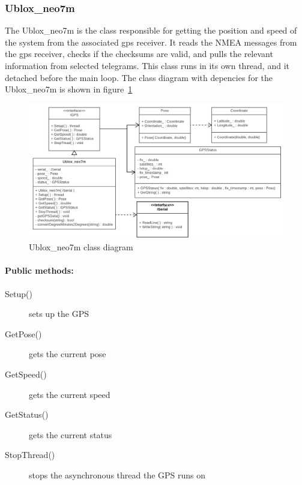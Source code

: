 \subsubsection{Ublox_neo7m}

The Ublox_neo7m is the class responsible for getting the position and speed of the system from the associated gps receiver. It reads the NMEA messages from the gps receiver, checks if the checksums are valid, and pulls the relevant information from selected telegrams. This class runs in its own thread, and it detached before the main loop. The class diagram with depencies for the Ublox_neo7m is shown in figure~\ref{fig:ubloxneo7m}

\begin{figure}[H]
\centering
\includegraphics[max width=1\linewidth]{Images/Design/ubloxNEO7M_class_diagram}
\caption{Ublox_neo7m class diagram}
\label{fig:ubloxneo7m}
\end{figure}

\paragraph{Public methods:}
\begin{adjustwidth}{2.5em}{0pt}\begin{description}
		\item [Setup()] sets up the GPS
		\item [GetPose()] gets the current pose
		\item [GetSpeed()] gets the current speed
		\item [GetStatus()] gets the current status
		\item [StopThread()] stops the asynchronous thread the GPS runs on
\end{description}\end{adjustwidth}

